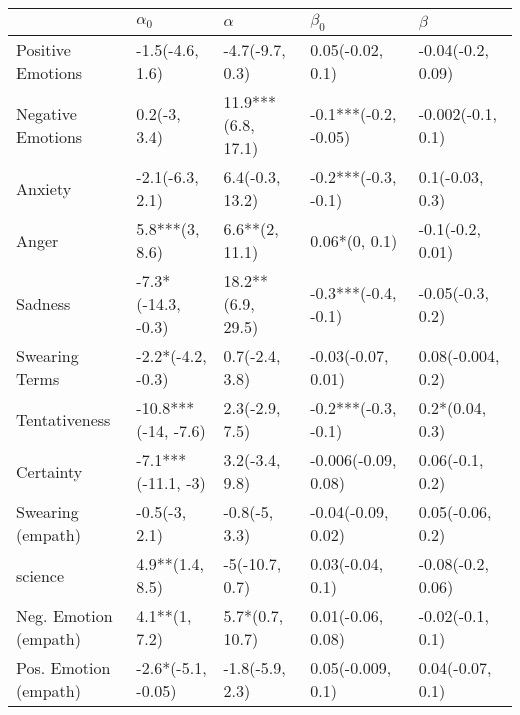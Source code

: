 \begin{tabular}{lllll}
\toprule
{} &           $\alpha_0$ &            $\alpha$ &             $\beta_0$ &            $\beta$ \\
\midrule
Positive Emotions     &      -1.5(-4.6, 1.6) &     -4.7(-9.7, 0.3) &      0.05(-0.02, 0.1) &  -0.04(-0.2, 0.09) \\
Negative Emotions     &         0.2(-3, 3.4) &  11.9***(6.8, 17.1) &  -0.1***(-0.2, -0.05) &  -0.002(-0.1, 0.1) \\
Anxiety               &      -2.1(-6.3, 2.1) &     6.4(-0.3, 13.2) &   -0.2***(-0.3, -0.1) &    0.1(-0.03, 0.3) \\
Anger                 &       5.8***(3, 8.6) &      6.6**(2, 11.1) &         0.06*(0, 0.1) &   -0.1(-0.2, 0.01) \\
Sadness               &   -7.3*(-14.3, -0.3) &   18.2**(6.9, 29.5) &   -0.3***(-0.4, -0.1) &   -0.05(-0.3, 0.2) \\
Swearing Terms        &    -2.2*(-4.2, -0.3) &      0.7(-2.4, 3.8) &    -0.03(-0.07, 0.01) &  0.08(-0.004, 0.2) \\
Tentativeness         &  -10.8***(-14, -7.6) &      2.3(-2.9, 7.5) &   -0.2***(-0.3, -0.1) &    0.2*(0.04, 0.3) \\
Certainty             &   -7.1***(-11.1, -3) &      3.2(-3.4, 9.8) &   -0.006(-0.09, 0.08) &    0.06(-0.1, 0.2) \\
Swearing (empath)     &        -0.5(-3, 2.1) &       -0.8(-5, 3.3) &    -0.04(-0.09, 0.02) &   0.05(-0.06, 0.2) \\
science               &      4.9**(1.4, 8.5) &      -5(-10.7, 0.7) &      0.03(-0.04, 0.1) &  -0.08(-0.2, 0.06) \\
Neg. Emotion (empath) &        4.1**(1, 7.2) &     5.7*(0.7, 10.7) &     0.01(-0.06, 0.08) &   -0.02(-0.1, 0.1) \\
Pos. Emotion (empath) &   -2.6*(-5.1, -0.05) &     -1.8(-5.9, 2.3) &     0.05(-0.009, 0.1) &   0.04(-0.07, 0.1) \\
\bottomrule
\end{tabular}

